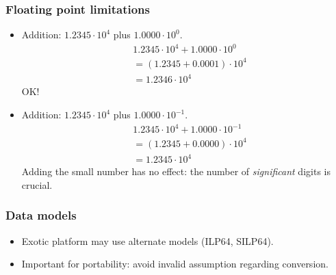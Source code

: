\begin{frame}
  \frametitle{Floating point limitations}
  \begin{itemize}
  \item Addition: $1.2345\cdot 10^4$ plus $1.0000\cdot 10^0$.
    \begin{align*}
      & 1.2345 \cdot 10^4 + 1.0000 \cdot 10^0 \\
      &= (1.2345 + 0.0001) \cdot 10^4 \\
      &= 1.2346 \cdot 10^4
    \end{align*}
    OK!
  \item Addition: $1.2345\cdot 10^4$ plus $1.0000\cdot 10^{-1}$.
    \begin{align*}
      & 1.2345 \cdot 10^4 + 1.0000 \cdot 10^{-1} \\
      &= (1.2345 + 0.0000) \cdot 10^4 \\
      &= 1.2345 \cdot 10^4
    \end{align*}
    Adding the small number has no effect: the number of \textit{significant} digits is crucial.
  \end{itemize}
\end{frame}

\begin{frame}
  \frametitle{Data models}
  \begin{center}
    
  \end{center}

\medskip

\begin{itemize}
\item Exotic platform may use alternate models (ILP64, SILP64).
\item Important for portability: avoid invalid assumption regarding conversion.
\end{itemize}

\end{frame}

